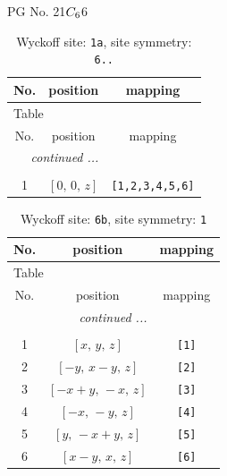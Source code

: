 \documentclass[fleqn,8pt]{jsarticle}
\begin{document}
\setcounter{MaxMatrixCols}{32}

\renewcommand{\tablename}{Table~}
\renewcommand{\figurename}{Figure~}
\begin{center}
\LARGE
PG No. 21\quad$C_{\rm 6}$\quad$6$\quad[ hexagonal ]
\end{center}
\renewcommand{\arraystretch}{1.2}
\begin{longtable}{ccc}
\caption{Wyckoff site: {\tt 1a}, site symmetry: {\tt 6..}}
 \\
 \hline \hline
No. & position & mapping \\ \hline \endfirsthead

\multicolumn{2}{l}{\tablename\ \thetable{}} \\
 \hline \hline
No. & position & mapping \\ \hline \endhead

 \hline \hline
\multicolumn{2}{r}{\footnotesize\it continued ...} \\ \endfoot

 \hline \hline
\multicolumn{2}{r}{} \\ \endlastfoot

1 & $\left[ 0,\, 0,\, z \right]$ & {\tt [1,2,3,4,5,6]} \\
\end{longtable}
\renewcommand{\arraystretch}{1.2}
\begin{longtable}{ccc}
\caption{Wyckoff site: {\tt 6b}, site symmetry: {\tt 1}}
 \\
 \hline \hline
No. & position & mapping \\ \hline \endfirsthead

\multicolumn{2}{l}{\tablename\ \thetable{}} \\
 \hline \hline
No. & position & mapping \\ \hline \endhead

 \hline \hline
\multicolumn{2}{r}{\footnotesize\it continued ...} \\ \endfoot

 \hline \hline
\multicolumn{2}{r}{} \\ \endlastfoot

1 & $\left[ x,\, y,\, z \right]$ & {\tt [1]} \\ \hline
2 & $\left[ - y,\, x - y,\, z \right]$ & {\tt [2]} \\ \hline
3 & $\left[ - x + y,\, - x,\, z \right]$ & {\tt [3]} \\ \hline
4 & $\left[ - x,\, - y,\, z \right]$ & {\tt [4]} \\ \hline
5 & $\left[ y,\, - x + y,\, z \right]$ & {\tt [5]} \\ \hline
6 & $\left[ x - y,\, x,\, z \right]$ & {\tt [6]} \\
\end{longtable}
\end{document}
